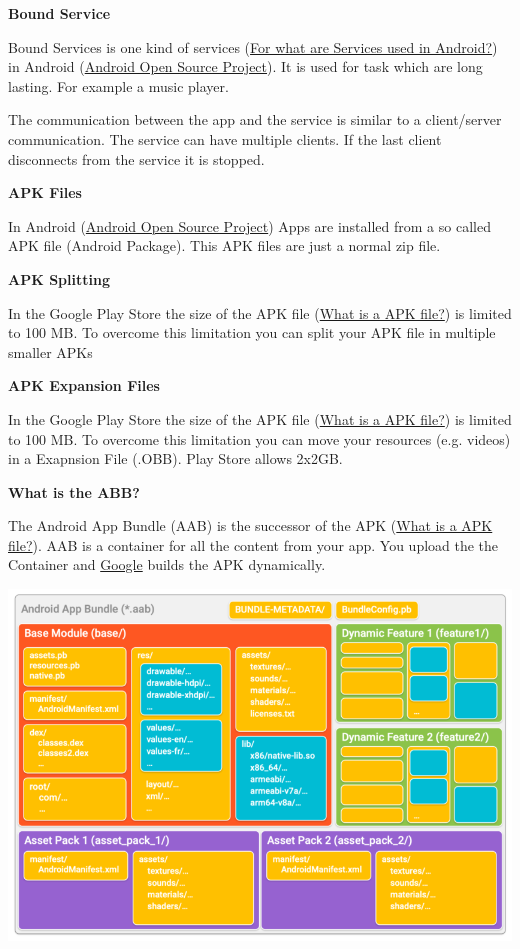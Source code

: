 \documentclass[11pt,twoside,landscape]{article}
\begin{document}
\begin{multicols}{3}
\textbf{Bound Service}

Bound Services is one kind of services (\href{../../../roam/20211109103648-for_what_are_services_used_in_android.org}{For what are Services used in Android?}) in Android (\href{../../../roam/20210921143632-aosp.org}{Android Open Source Project}).
It is used for task which are long lasting.
For example a music player.

The communication between the app and the service is similar to a client/server communication.
The service can have multiple clients.
If the last client disconnects from the service it is stopped. 

\textbf{APK Files}

In Android (\href{../../../roam/20210921143632-aosp.org}{Android Open Source Project}) Apps are installed from a so called APK file (Android Package).
This APK files are just a normal zip file.

\textbf{APK Splitting}

In the Google Play Store the size of the APK file (\href{../../../roam/20211109113541-what_is_a_apk_file.org}{What is a APK file?}) is limited to 100 MB.
To overcome this limitation you can split your APK file in multiple smaller APKs

\textbf{APK Expansion Files}

In the Google Play Store the size of the APK file (\href{../../../roam/20211109113541-what_is_a_apk_file.org}{What is a APK file?}) is limited to 100 MB.
To overcome this limitation you can move your resources (e.g. videos) in a Exapnsion File (.OBB).
Play Store allows 2x2GB.

\textbf{What is the ABB?}

The Android App Bundle (AAB) is the successor of the APK (\href{../../../roam/20211109113541-what_is_a_apk_file.org}{What is a APK file?}).
AAB is a container for all the content from your app. You upload the the Container and \href{../../../roam/20211111145536-google.org}{Google} builds the APK dynamically. 

\begin{center}
\includegraphics[width=.9\linewidth]{img/android_app_bundle.png}
\end{center}


\end{multicols}
\end{document}
